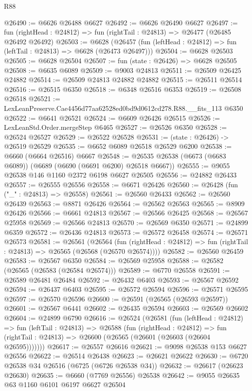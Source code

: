 \begin{lexlean}{R88}
\begin{coremodule}
@26490 := @6626 @26488 @6627
@26492 := @6626 @26490 @6627
@26497 := fun (rightHead : @24812) => fun (rightTail : @24813) => @26477 (@26485 @26492 @26492)
@26503 := @6628
    (@26457 (fun (leftHead : @24812) => fun (leftTail : @24813) => @6628 (@26473 @26497)))
@26504 := @6628 @26503
@26505 := @6628 @26504
@26507 := fun (state : @26426) => @6628 @26505
@26508 := @6635 @6089
@26509 := @9003 @24813
@26511 := @26509 @26425 @24882
@26514 := @26509 @24813 @24882 @24882
@26515 := @26511 @26514
@26516 := @26515 @6350
@26518 := @6348 @26516 @6353
@26519 := @26508 @26518
@26521 := LexLeanPreserve.Cae4456d77aa62528ed0bd9d0612cd278.R88.__fits_113 @6350
@26522 := @6641 @26521
@26524 := @6609 @26426 @26515
@26526 := LexLeanStd.Order.mergeStep @6465
@26527 := @26526 @6350
@26528 := @26524 @26527
@26529 := @26522 @26528
@26531 := (state : @26426) -> @26519 @26529
@26535 := @6652 @6089 @26518 @26529 @6200
@26538 := @6660 (@6664 @26516) @6667
@26548 := @26535 @26538 (@6673 (@6683 @6089)) (@6689 (@6690 (@6691 @6200) @26518 @6667))
@26555 := @9055 @26538 @146 @1160 @2372 @6198 @6627 @26505
@26556 := @24882 @26433
@26557 := @26555 @26556
@26558 := @6671 @26426
@26560 := @26428 (fun ("_" : @24813) => @26558)
@26561 := @26560 @26433
@26562 := @26560 @26439
@26563 := @8871 @26426
@26564 := @26562 @26563
@26565 := @8909 @26426
@26566 := @6661 @24813
@26567 := @26566 @26425
@26568 := @26567 @25958
@26569 := @26566 @24813
@26570 := @26569 @6350
@26571 := @24899 @6359
@26572 := @26436 @24813
@26573 := @26572 @26458
@26574 := @26571 @26573
@26581 := @26561
    (@26564
      (fun (rightHead : @24812) => fun (rightTail : @24813) => @26565 (@26568 (@26570 @26574))))
@26582 := @26560 @26459
@26583 := @26567 @6350
@26584 := @26569 @25958
@26588 := @26582 (@26565 (@26583 (@26584 @26574)))
@26589 := @6770 @26558
@26591 := @26589 @26481 @26484
@26592 := @26432 @6403
@26593 := @26567 @26592
@26594 := @26437 @6403
@26595 := @26572 @26594
@26596 := @26571 @26595
@26597 := @26570 @26596
@26600 := @26591 (@26565 (@26593 @26597))
@26601 := @26567 @6441
@26602 := @26435 @26594
@26603 := @26569 @26602
@26604 := @24899 @6790
@26616 := @26524
    (@26581
      (fun (leftHead : @24812) =>
      fun (leftTail : @24813) =>
      @26588
        (fun (rightHead : @24812) =>
        fun (rightTail : @24813) => @26600 (@26565 (@26601 (@26603 (@26604 @26595)))))))
@26617 := @26557 @26616
@26621 := @9098 @26538 @153 @6627 @26556
@26622 := @26514 @26438
@26623 := @26621 @26622
@26630 := @6720 @26538 @34 @26516 (@6725 (@6726 @26538 @34))
@26632 := @26617 (@26623 @26630)
@26635 := @6660 (@7769 @26556) @26538
@26642 := @9055 @26635 @63 @1160 @6101 @6197 @6627 @26504

\end{coremodule}
\end{lexlean}
